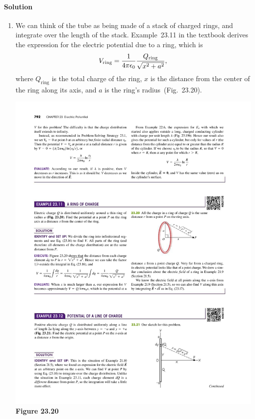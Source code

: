 \documentclass[11pt]{article}
\newcommand{\beq}{\begin{equation*}}
\newcommand{\eeq}{\end{equation*}}
\newenvironment{solution}
{
    \paragraph{Solution}
    \ignorespaces
}
{
    \bigskip
}
\begin{document}
\begin{solution}
	\begin{enumerate}
		\item We can think of the tube as being made of a stack of charged rings, and integrate over the length of the stack.  Example~23.11 in the textbook derives the expression for the electric potential due to a ring, which is
		\beq
			V_\text{ring} = \fk \frac{Q_\text{ring}}{\sqrt{x^2 + a^2}},
		\eeq
		where $Q_\text{ring}$ is the total charge of the ring, $x$ is the distance from the center of the ring along its axis, and $a$ is the ring's radius~(Fig.~23.20).
			
		\begin{center}
			\includegraphics{23-20} \\
			\textbf{Figure 23.20}
		\end{center}


\end{enumerate}
\end{solution}
\end{document}

